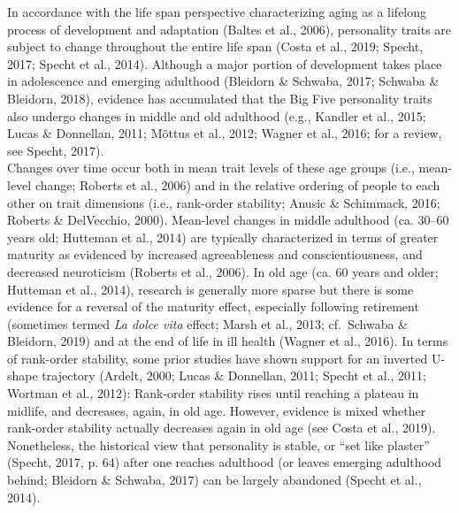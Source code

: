 \documentclass[
  english,
  man, noextraspace]{apa7}
\begin{document}
In accordance with the life span perspective characterizing aging as a lifelong process of development and adaptation (Baltes et al., 2006), personality traits are subject to change throughout the entire life span (Costa et al., 2019; Specht, 2017; Specht et al., 2014). Although a major portion of development takes place in adolescence and emerging adulthood (Bleidorn \& Schwaba, 2017; Schwaba \& Bleidorn, 2018), evidence has accumulated that the Big Five personality traits also undergo changes in middle and old adulthood (e.g., Kandler et al., 2015; Lucas \& Donnellan, 2011; Mõttus et al., 2012; Wagner et al., 2016; for a review, see Specht, 2017).\\
Changes over time occur both in mean trait levels of these age groups (i.e., mean-level change; Roberts et al., 2006) and in the relative ordering of people to each other on trait dimensions (i.e., rank-order stability; Anusic \& Schimmack, 2016; Roberts \& DelVecchio, 2000). Mean-level changes in middle adulthood (ca. 30--60 years old; Hutteman et al., 2014) are typically characterized in terms of greater maturity as evidenced by increased agreeableness and conscientiousness, and decreased neuroticism (Roberts et al., 2006). In old age (ca. 60 years and older; Hutteman et al., 2014), research is generally more sparse but there is some evidence for a reversal of the maturity effect, especially following retirement (sometimes termed \emph{La dolce vita} effect; Marsh et al., 2013; cf.~Schwaba \& Bleidorn, 2019) and at the end of life in ill health (Wagner et al., 2016). In terms of rank-order stability, some prior studies have shown support for an inverted U-shape trajectory (Ardelt, 2000; Lucas \& Donnellan, 2011; Specht et al., 2011; Wortman et al., 2012): Rank-order stability rises until reaching a plateau in midlife, and decreases, again, in old age. However, evidence is mixed whether rank-order stability actually decreases again in old age (see Costa et al., 2019). Nonetheless, the historical view that personality is stable, or \enquote{set like plaster} (Specht, 2017, p. 64) after one reaches adulthood (or leaves emerging adulthood behind; Bleidorn \& Schwaba, 2017) can be largely abandoned (Specht et al., 2014).\\
\end{document}
